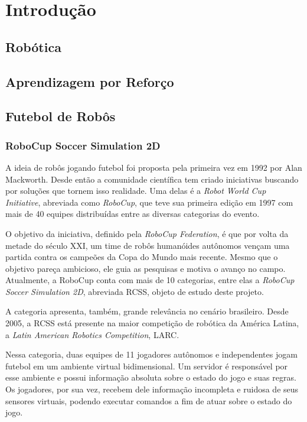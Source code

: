 
\chapter{Introdução}

\label{CapIntro}


\section{Robótica}

\section{Aprendizagem por Reforço}

\section{Futebol de Robôs}

\subsection{RoboCup Soccer Simulation 2D}
\par A ideia de robôs jogando futebol foi proposta pela primeira vez em 1992 por Alan Mackworth\cite{mackworth1993seeing}.
Desde então a comunidade científica tem criado iniciativas buscando por soluções que tornem isso realidade.
Uma delas é a \textit{Robot World Cup Initiative}, abreviada como \textit{RoboCup}, que teve sua primeira edição em 1997 com mais de 40 equipes distribuídas entre as diversas categorias do evento.
\par O objetivo da iniciativa, definido pela \textit{RoboCup Federation}, é que por volta da metade do século XXI, um time de robôs humanóides autônomos vençam uma partida contra os campeões da Copa do Mundo mais recente. Mesmo que o objetivo pareça ambicioso, ele guia as pesquisas e motiva o avanço no campo.
Atualmente, a RoboCup conta com mais de 10 categorias, entre elas a \textit{RoboCup Soccer Simulation 2D}, abreviada RCSS, objeto de estudo deste projeto.
\par A categoria apresenta, também, grande relevância no cenário brasileiro.
Desde 2005, a RCSS está presente na maior competição de robótica da América Latina, a \textit{Latin American Robotics Competition}, LARC.
\par Nessa categoria, duas equipes de 11 jogadores autônomos e independentes jogam futebol em um ambiente virtual bidimensional.
Um servidor é responsável por esse ambiente e possui informação absoluta sobre o estado do jogo e suas regras.
Os jogadores, por sua vez, recebem dele informação incompleta e ruidosa de seus sensores virtuais, podendo executar comandos a fim de atuar sobre o estado do jogo.

